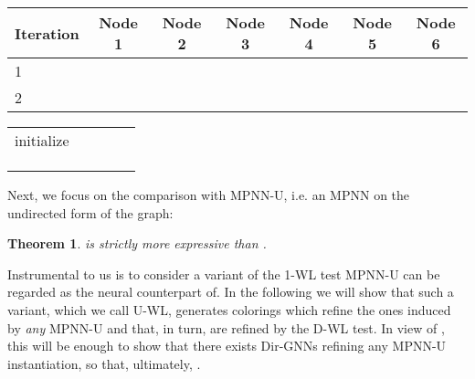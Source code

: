 \documentclass{article}
\theoremstyle{plain}
\newtheorem{theorem}{Theorem}[section]
\theoremstyle{definition}
\theoremstyle{remark}
\begin{document}
\begin{table*}[t]
\vskip 0.15in
\begin{center}
\begin{small}
\begin{sc}
\begin{tabular}{l||ccc|ccc}
\toprule
Iteration     & Node 1  & Node 2 & Node 3 & Node 4 & Node 5  & Node 6 \\
\midrule
1             &        &       &       &       &        &       \\
2             &        &       &       &       &        &       \\
\bottomrule
\end{tabular}

\begin{tabular}{lcccr}
\toprule
                                               &    \\
\midrule
initialize                                           &                           \\
              &                           \\
             &                           \\
             &                           \\
\bottomrule
\end{tabular}

\end{sc}
\end{small}
\end{center}
\caption{Node colorings at different iterations, , as well as the  hash function, when applying D-WL to the two graphs in~\cref{fig:mpnn-u_fails}.}
\label{tab:wl-d-2}
\end{table*}




 
Next, we focus on the comparison with MPNN-U, i.e. an MPNN on the undirected form of the graph: 

\begin{theorem}\label{thm:dirgnn-strictly-more-expressive-than-mpnn-u}
     is strictly more expressive than .
\end{theorem}

Instrumental to us is to consider a variant of the 1-WL test MPNN-U can be regarded as the neural counterpart of. In the following we will show that such a variant, which we call U-WL, generates colorings which refine the ones induced by \emph{any} MPNN-U and that, in turn, are refined by the D-WL test. In view of , this will be enough to show that there exists Dir-GNNs refining any MPNN-U instantiation, so that, ultimately, .
\end{document}
